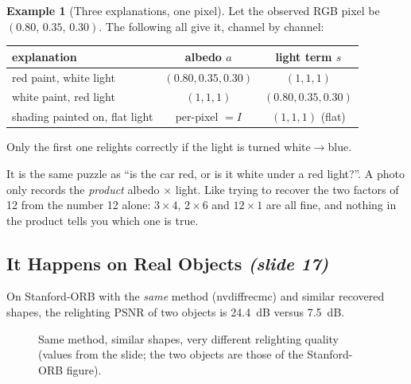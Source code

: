 \documentclass[11pt,a4paper]{article}
\theoremstyle{definition}
\newtheorem{example}[definition]{Example}
\theoremstyle{plain}
\theoremstyle{remark}
\newcommand{\slideone}[1]{\texorpdfstring{\emph{(slide #1)}}{(slide #1)}}
\begin{document}
\begin{example}[Three explanations, one pixel]
Let the observed RGB pixel be $(0.80,\,0.35,\,0.30)$. The following all give it, channel by channel:
\begin{center}
\begin{tabular}{lcc}
\toprule
explanation & albedo $a$ & light term $s$\\
\midrule
red paint, white light & $(0.80,0.35,0.30)$ & $(1,1,1)$\\
white paint, red light & $(1,1,1)$ & $(0.80,0.35,0.30)$\\
shading painted on, flat light & per-pixel $=I$ & $(1,1,1)$ (flat)\\
\bottomrule
\end{tabular}
\end{center}
Only the first one relights correctly if the light is turned white$\to$blue.
\end{example}

\begin{intuition}
It is the same puzzle as ``is the car red, or is it white under a red light?''. A photo only records the \emph{product} albedo $\times$ light. Like trying to recover the two factors of 12 from the number 12 alone: $3\times4$, $2\times6$ and $12\times1$ are all fine, and nothing in the product tells you which one is true.
\end{intuition}

\subsection{It Happens on Real Objects \slideone{17}}

On Stanford-ORB with the \emph{same} method (nvdiffrecmc) and similar recovered shapes, the relighting PSNR of two objects is 24.4~dB versus 7.5~dB.

\begin{figure}[!htbp]\centering
{}
\caption{Same method, similar shapes, very different relighting quality (values from the slide; the two objects are those of the Stanford-ORB figure).}
\end{figure}
\end{document}
